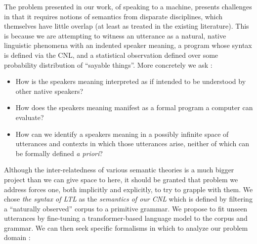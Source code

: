\documentclass{article}
\begin{document}
The problem presented in our work, of speaking to a machine, presents challenges
in that it requires notions of semantics from disparate disciplines, which
themselves have little overlap (at least as treated in the existing literature).
This is because we are attempting to witness an utterance as a natural, native
linguistic phenomena with an indented speaker meaning, a program whose syntax is
defined via the CNL, and a statistical observation defined over some probability
distribution of ``sayable things''. More concretely we ask :

\begin{itemize}
\item How is the speakers meaning interpreted as if intended to be understood by
 other native speakers?
\item How does the speakers meaning manifest as a formal program a computer can
 evaluate?
\item How can we identify a speakers meaning in a possibly infinite space of
 utterances and contexts in which those utterances arise, neither of which can
 be formally defined \emph{a priori}?
\end{itemize}

Although the inter-relatedness of various semantic theories is a much bigger
project than we can give space to here, it should be granted that problem we
address forces one, both implicitly and explicitly, to try to grapple with them.
We chose \emph{the syntax of LTL} as the \emph{semantics of our CNL} which is
defined by filtering a ``naturally observed'' corpus to a primitive grammar. We
propose to fit unseen utterances by fine-tuning a transformer-based language
model to the corpus and grammar. We can then seek specific formalisms in which
to analyze our problem domain :
\end{document}
